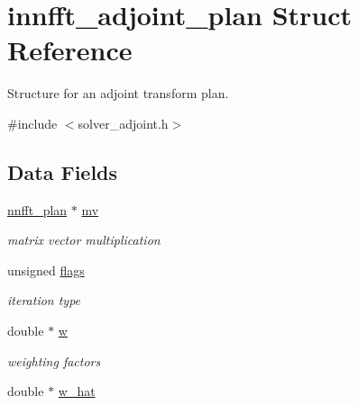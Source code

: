 \hypertarget{structinnfft__adjoint__plan}{\section{innfft\-\_\-adjoint\-\_\-plan Struct Reference}
\label{structinnfft__adjoint__plan}
}


Structure for an adjoint transform plan.  




{\ttfamily \#include $<$solver\-\_\-adjoint.\-h$>$}

\subsection*{Data Fields}
\begin{DoxyCompactItemize}
\item 
\hypertarget{structinnfft__adjoint__plan_abb0996d6ed2cd627dc28fb7f5c18007a}{\hyperlink{structnnfft__plan}{nnfft\-\_\-plan} $\ast$ \hyperlink{structinnfft__adjoint__plan_abb0996d6ed2cd627dc28fb7f5c18007a}{mv}}\label{structinnfft__adjoint__plan_abb0996d6ed2cd627dc28fb7f5c18007a}

\begin{DoxyCompactList}\small\item\em matrix vector multiplication \end{DoxyCompactList}\item 
\hypertarget{structinnfft__adjoint__plan_a0d51c3ece7512b04408b5a2b94ee4a05}{unsigned \hyperlink{structinnfft__adjoint__plan_a0d51c3ece7512b04408b5a2b94ee4a05}{flags}}\label{structinnfft__adjoint__plan_a0d51c3ece7512b04408b5a2b94ee4a05}

\begin{DoxyCompactList}\small\item\em iteration type \end{DoxyCompactList}\item 
\hypertarget{structinnfft__adjoint__plan_a20565dbd14d036eb348ca0276a4f411c}{double $\ast$ \hyperlink{structinnfft__adjoint__plan_a20565dbd14d036eb348ca0276a4f411c}{w}}\label{structinnfft__adjoint__plan_a20565dbd14d036eb348ca0276a4f411c}

\begin{DoxyCompactList}\small\item\em weighting factors \end{DoxyCompactList}\item 
\hypertarget{structinnfft__adjoint__plan_a0545064b15a22a5a3ae285e6aded5f80}{double $\ast$ \hyperlink{structinnfft__adjoint__plan_a0545064b15a22a5a3ae285e6aded5f80}{w\-\_\-hat}}\label{structinnfft__adjoint__plan_a0545064b15a22a5a3ae285e6aded5f80}


\end{DoxyCompactItemize}
